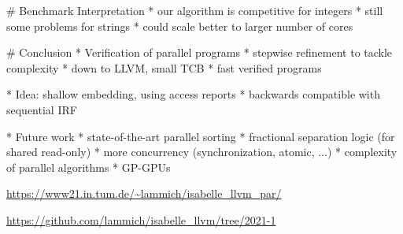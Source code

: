 \documentclass[fleqn]{beamer}
\newcommand{\high}[1]{{\color{blue}#1}}
\begin{document}
# Benchmark Interpretation
  * our algorithm is competitive for integers
  * still some problems for strings
  * could scale better to larger number of cores


{

# Conclusion
  * Verification of parallel programs
    * stepwise refinement to tackle complexity
    * down to LLVM, small TCB
    * \high{fast} verified programs

  * Idea: shallow embedding, using access reports
    * backwards compatible with sequential IRF

  * Future work
    * state-of-the-art parallel sorting
    * fractional separation logic (for shared read-only)
    * more concurrency (synchronization, atomic, ...)
    * complexity of parallel algorithms
    * GP-GPUs

  \vfill
  \url{https://www21.in.tum.de/~lammich/isabelle_llvm_par/}

  \url{https://github.com/lammich/isabelle_llvm/tree/2021-1}


}



\end{document}
